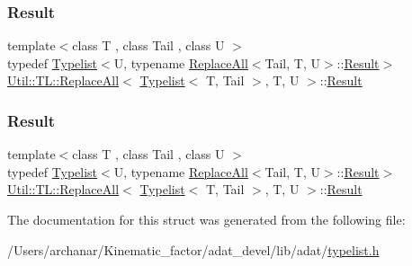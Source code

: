\subsubsection{\texorpdfstring{Result}{Result}\hspace{0.1cm}{\footnotesize\ttfamily [1/2]}}
{\footnotesize\ttfamily template$<$class T , class Tail , class U $>$ \\
typedef \mbox{\hyperlink{structUtil_1_1Typelist}{Typelist}}$<$U, typename \mbox{\hyperlink{structUtil_1_1TL_1_1ReplaceAll}{Replace\+All}}$<$Tail, T, U$>$\+::\mbox{\hyperlink{structUtil_1_1TL_1_1ReplaceAll_3_01Typelist_3_01T_00_01Tail_01_4_00_01T_00_01U_01_4_ac7e5d69efc7e252ec9e6db5a6885ac44}{Result}}$>$ \mbox{\hyperlink{structUtil_1_1TL_1_1ReplaceAll}{Util\+::\+T\+L\+::\+Replace\+All}}$<$ \mbox{\hyperlink{structUtil_1_1Typelist}{Typelist}}$<$ T, Tail $>$, T, U $>$\+::\mbox{\hyperlink{structUtil_1_1TL_1_1ReplaceAll_3_01Typelist_3_01T_00_01Tail_01_4_00_01T_00_01U_01_4_ac7e5d69efc7e252ec9e6db5a6885ac44}{Result}}}

\mbox{\label{structUtil_1_1TL_1_1ReplaceAll_3_01Typelist_3_01T_00_01Tail_01_4_00_01T_00_01U_01_4_ac7e5d69efc7e252ec9e6db5a6885ac44}} 
\subsubsection{\texorpdfstring{Result}{Result}\hspace{0.1cm}{\footnotesize\ttfamily [2/2]}}
{\footnotesize\ttfamily template$<$class T , class Tail , class U $>$ \\
typedef \mbox{\hyperlink{structUtil_1_1Typelist}{Typelist}}$<$U, typename \mbox{\hyperlink{structUtil_1_1TL_1_1ReplaceAll}{Replace\+All}}$<$Tail, T, U$>$\+::\mbox{\hyperlink{structUtil_1_1TL_1_1ReplaceAll_3_01Typelist_3_01T_00_01Tail_01_4_00_01T_00_01U_01_4_ac7e5d69efc7e252ec9e6db5a6885ac44}{Result}}$>$ \mbox{\hyperlink{structUtil_1_1TL_1_1ReplaceAll}{Util\+::\+T\+L\+::\+Replace\+All}}$<$ \mbox{\hyperlink{structUtil_1_1Typelist}{Typelist}}$<$ T, Tail $>$, T, U $>$\+::\mbox{\hyperlink{structUtil_1_1TL_1_1ReplaceAll_3_01Typelist_3_01T_00_01Tail_01_4_00_01T_00_01U_01_4_ac7e5d69efc7e252ec9e6db5a6885ac44}{Result}}}



The documentation for this struct was generated from the following file\+:\begin{DoxyCompactItemize}
\item 
/\+Users/archanar/\+Kinematic\+\_\+factor/adat\+\_\+devel/lib/adat/\mbox{\hyperlink{lib_2adat_2typelist_8h}{typelist.\+h}}\end{DoxyCompactItemize}
